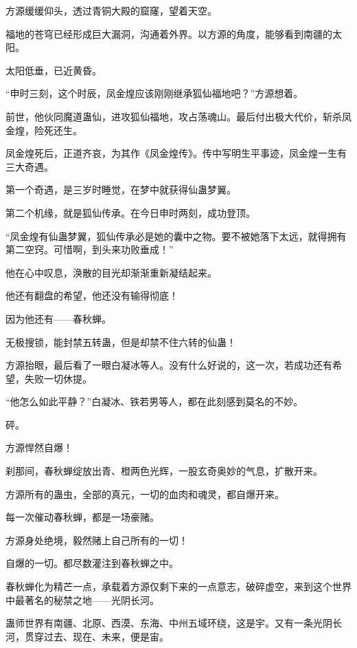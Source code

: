 
\begin{this_body}



方源缓缓仰头，透过青铜大殿的窟窿，望着天空。

福地的苍穹已经形成巨大漏洞，沟通着外界。以方源的角度，能够看到南疆的太阳。

太阳低垂，已近黄昏。

“申时三刻，这个时辰，凤金煌应该刚刚继承狐仙福地吧？”方源想着。

前世，他伙同魔道蛊仙，进攻狐仙福地，攻占荡魂山。最后付出极大代价，斩杀凤金煌，险死还生。

凤金煌死后，正道齐哀，为其作《凤金煌传》。传中写明生平事迹，凤金煌一生有三大奇遇。

第一个奇遇，是三岁时睡觉，在梦中就获得仙蛊梦翼。

第二个机缘，就是狐仙传承。在今日申时两刻，成功登顶。

“凤金煌有仙蛊梦翼，狐仙传承必是她的囊中之物。要不被她落下太远，就得拥有第二空窍。可惜啊，到头来功败垂成！”

他在心中叹息，涣散的目光却渐渐重新凝结起来。

他还有翻盘的希望，他还没有输得彻底！

因为他还有——春秋蝉。

无极搜锁，能封禁五转蛊，但是却禁不住六转的仙蛊！

方源抬眼，最后看了一眼白凝冰等人。没有什么好说的，这一次，若成功还有希望，失败一切休提。

“他怎么如此平静？”白凝冰、铁若男等人，都在此刻感到莫名的不妙。

砰。

方源悍然自爆！

刹那间，春秋蝉绽放出青、橙两色光辉，一股玄奇奥妙的气息，扩散开来。

方源所有的蛊虫，全部的真元，一切的血肉和魂灵，都自爆开来。

每一次催动春秋蝉，都是一场豪赌。

方源身处绝境，毅然赌上自己所有的一切！

自爆的一切。都尽数灌注到春秋蝉之中。

春秋蝉化为精芒一点，承载着方源仅剩下来的一点意志，破碎虚空，来到这个世界中最著名的秘禁之地——光阴长河。

蛊师世界有南疆、北原、西漠、东海、中州五域环绕，这是宇。又有一条光阴长河，贯穿过去、现在、未来，便是宙。


\end{this_body}
